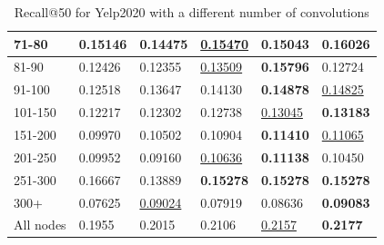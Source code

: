 \begin{table}[]
\begin{tabular}{|l|l|l|l|l|l|}
        71-80     & 0.15146                    & 0.14475                    & \underline{0.15470}        & 0.15043                    & \textbf{0.16026}           \\ \hline
        81-90     & 0.12426                    & 0.12355                    & \underline{0.13509}        & \textbf{0.15796}           & 0.12724                    \\ \hline
        91-100    & 0.12518                    & 0.13647                    & 0.14130                    & \textbf{0.14878}           & \underline{0.14825}        \\ \hline
        101-150   & 0.12217                    & 0.12302                    & 0.12738                    & \underline{0.13045}        & \textbf{0.13183}           \\ \hline
        151-200   & 0.09970                    & 0.10502                    & 0.10904                    & \textbf{0.11410}           & \underline{0.11065}        \\ \hline
        201-250   & 0.09952                    & 0.09160                    & \underline{0.10636}        & \textbf{0.11138}           & 0.10450                    \\ \hline
        251-300   & 0.16667                    & 0.13889                    & \textbf{0.15278}           & \textbf{0.15278}           & \textbf{0.15278}           \\ \hline
        300+      & 0.07625                    & \underline{0.09024}        & 0.07919                    & 0.08636                    & \textbf{0.09083}           \\ \hline
        All nodes & 0.1955                     & 0.2015                     & 0.2106                     & \underline{0.2157}         & \textbf{0.2177}            \\ \hline
    \end{tabular}
    \caption{Recall@50 for Yelp2020 with a different number of convolutions}
    \label{tab:Yelp2020-recall-evaluation-mean}
\end{table}

